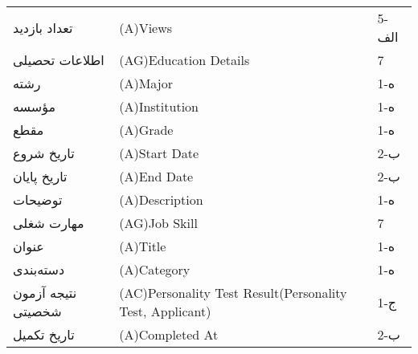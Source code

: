 \documentclass[12pt]{article}
\begin{document}
\begin{table}[]
\begin{tabular}{lll}
			تعداد بازدید                         & (A)Views                                                                                                      & 5-الف \\
			اطلاعات تحصیلی                       & (AG)Education Details                                                                                         & 7     \\
			رشته                                 & (A)Major                                                                                                      & 1-ه   \\
			مؤسسه                                & (A)Institution                                                                                                & 1-ه   \\
			مقطع                                 & (A)Grade                                                                                                      & 1-ه   \\
			تاریخ شروع                           & (A)Start Date                                                                                                 & 2-ب   \\
			تاریخ پایان                          & (A)End Date                                                                                                   & 2-ب   \\
			توضیحات                              & (A)Description                                                                                                & 1-ه   \\
			مهارت شغلی                           & (AG)Job Skill                                                                                                 & 7     \\
			عنوان                                & (A)Title                                                                                                      & 1-ه   \\
			دسته‌بندی                            & (A)Category                                                                                                   & 1-ه   \\
			نتیجه آزمون شخصیتی                   & (AC)Personality Test Result(Personality Test, Applicant)                                                      & 1-ج   \\
			تاریخ تکمیل                          & (A)Completed At                                                                                               & 2-ب   \\

\end{tabular}
\end{table}
\end{document}
